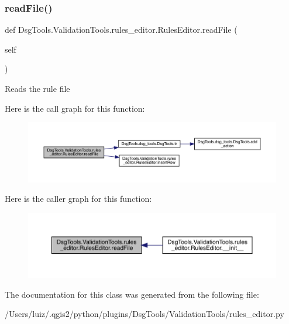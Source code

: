 \subsubsection{\texorpdfstring{read\+File()}{readFile()}}
{\footnotesize\ttfamily def Dsg\+Tools.\+Validation\+Tools.\+rules\+\_\+editor.\+Rules\+Editor.\+read\+File (\begin{DoxyParamCaption}\item[{}]{self }\end{DoxyParamCaption})}

\begin{DoxyVerb}Reads the rule file
\end{DoxyVerb}
 Here is the call graph for this function\+:
\nopagebreak
\begin{figure}[H]
\begin{center}
\leavevmode
\includegraphics[width=350pt]{class_dsg_tools_1_1_validation_tools_1_1rules__editor_1_1_rules_editor_aa15c2337138799088f04093a543d3112_cgraph}
\end{center}
\end{figure}
Here is the caller graph for this function\+:
\nopagebreak
\begin{figure}[H]
\begin{center}
\leavevmode
\includegraphics[width=350pt]{class_dsg_tools_1_1_validation_tools_1_1rules__editor_1_1_rules_editor_aa15c2337138799088f04093a543d3112_icgraph}
\end{center}
\end{figure}


The documentation for this class was generated from the following file\+:\begin{DoxyCompactItemize}
\item 
/\+Users/luiz/.\+qgis2/python/plugins/\+Dsg\+Tools/\+Validation\+Tools/rules\+\_\+editor.\+py\end{DoxyCompactItemize}
